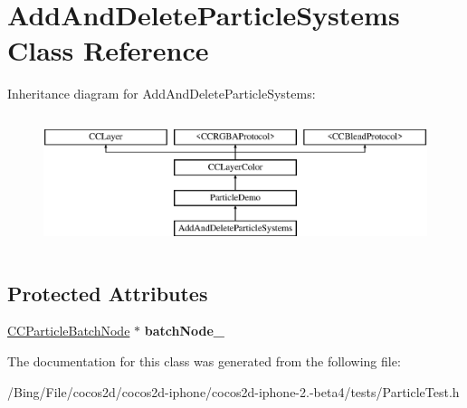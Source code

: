 \hypertarget{interface_add_and_delete_particle_systems}{\section{Add\-And\-Delete\-Particle\-Systems Class Reference}
\label{interface_add_and_delete_particle_systems}
}
Inheritance diagram for Add\-And\-Delete\-Particle\-Systems\-:\begin{figure}[H]
\begin{center}
\leavevmode
\includegraphics[height=3.909250cm]{interface_add_and_delete_particle_systems}
\end{center}
\end{figure}
\subsection*{Protected Attributes}
\begin{DoxyCompactItemize}
\item 
\hypertarget{interface_add_and_delete_particle_systems_ae2d67fb7b8187e507623be90a08157da}{\hyperlink{interface_c_c_particle_batch_node}{C\-C\-Particle\-Batch\-Node} $\ast$ {\bfseries batch\-Node\-\_\-}}\label{interface_add_and_delete_particle_systems_ae2d67fb7b8187e507623be90a08157da}

\end{DoxyCompactItemize}


The documentation for this class was generated from the following file\-:\begin{DoxyCompactItemize}
\item 
/\-Bing/\-File/cocos2d/cocos2d-\/iphone/cocos2d-\/iphone-\/2.-\/beta4/tests/Particle\-Test.\-h\end{DoxyCompactItemize}
